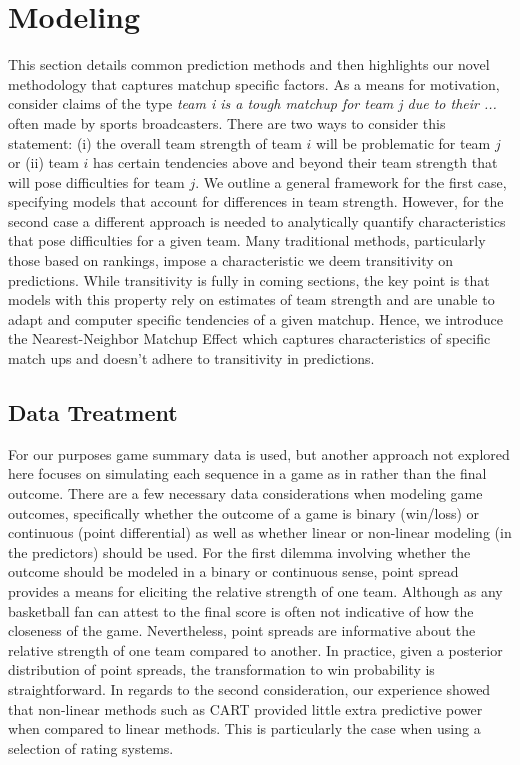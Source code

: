 \section{Modeling}
This section details common prediction methods and then highlights our novel methodology that captures matchup specific factors. As a means for motivation, consider claims of the type \emph{team i is a tough matchup for team j due to their ...} often made by sports broadcasters. There are two ways to consider this statement: (i) the overall team strength of team $i$ will be problematic for team $j$ or (ii) team $i$ has certain tendencies above and beyond their team strength that will pose difficulties for team $j$. We outline a general framework for the first case, specifying models that account for differences in team strength. However, for the second case a different approach is needed to analytically quantify characteristics that pose difficulties for a given team. Many traditional methods, particularly those based on rankings, impose a characteristic we deem transitivity on predictions. While transitivity is fully in coming sections, the key point is that models with this property rely on estimates of team strength and are unable to adapt and computer specific tendencies of a given matchup. Hence, we introduce the Nearest-Neighbor Matchup Effect which captures characteristics of specific match ups and doesn't adhere to transitivity in predictions.  

\subsection{Data Treatment}
For our purposes game summary data is used, but another approach not explored here focuses on simulating each sequence in a game as in \cite{vstrumbelj2012} rather than the final outcome. There are a few necessary data considerations when modeling game outcomes, specifically whether the outcome of a game is binary (win/loss) or continuous (point differential) as well as whether linear or non-linear modeling (in the predictors) should be used. For the first dilemma involving whether the outcome should be modeled in a binary or continuous sense, point spread provides a means for eliciting the relative strength of one team. Although as any basketball fan can attest to the final score is often not indicative of how the closeness of the game. Nevertheless, point spreads are informative about the relative strength of one team compared to another. In practice, given a posterior distribution of point spreads, the transformation to win probability is straightforward.  In regards to the second consideration, our experience showed that non-linear methods such as CART provided little extra predictive power when compared to linear methods. This is particularly the case when using a selection of rating systems.

